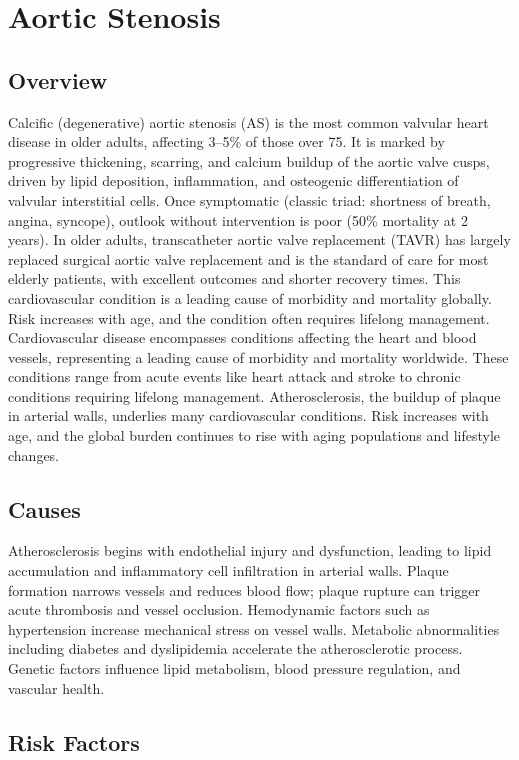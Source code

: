 \chapter{Aortic Stenosis}
\label{sec:geriatric:Aortic Stenosis}

\section{Overview}
Calcific (degenerative) aortic stenosis (AS) is the most common valvular heart disease in older adults, affecting 3--5\% of those over 75. It is marked by progressive thickening, scarring, and calcium buildup of the aortic valve cusps, driven by lipid deposition, inflammation, and osteogenic differentiation of valvular interstitial cells. Once symptomatic (classic triad: shortness of breath, angina, syncope), outlook without intervention is poor (50\% mortality at 2 years). In older adults, transcatheter aortic valve replacement (TAVR) has largely replaced surgical aortic valve replacement and is the standard of care for most elderly patients, with excellent outcomes and shorter recovery times. This cardiovascular condition is a leading cause of morbidity and mortality globally. Risk increases with age, and the condition often requires lifelong management. Cardiovascular disease encompasses conditions affecting the heart and blood vessels, representing a leading cause of morbidity and mortality worldwide. These conditions range from acute events like heart attack and stroke to chronic conditions requiring lifelong management. Atherosclerosis, the buildup of plaque in arterial walls, underlies many cardiovascular conditions. Risk increases with age, and the global burden continues to rise with aging populations and lifestyle changes.
\section{Causes}
Atherosclerosis begins with endothelial injury and dysfunction, leading to lipid accumulation and inflammatory cell infiltration in arterial walls. Plaque formation narrows vessels and reduces blood flow; plaque rupture can trigger acute thrombosis and vessel occlusion. Hemodynamic factors such as hypertension increase mechanical stress on vessel walls. Metabolic abnormalities including diabetes and dyslipidemia accelerate the atherosclerotic process. Genetic factors influence lipid metabolism, blood pressure regulation, and vascular health.
\section{Risk Factors}

